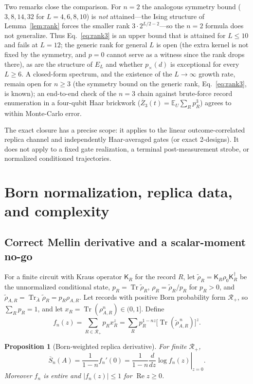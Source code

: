 \documentclass[aps,prx,reprint,superscriptaddress,nobibnotes,longbibliography]{revtex4-2}
\newtheorem{proposition}{Proposition}
\theoremstyle{remark}
\newcommand{\Tr}{\operatorname{Tr}}
\newcommand{\E}{\mathbb E}
\begin{document}
Two remarks close the comparison.  For $n=2$ the analogous symmetry bound ($3,8,14,32$ for $L=4,6,8,10$) is \emph{not} attained---the Ising structure of Lemma~\ref{lem:rank} forces the smaller rank $3\cdot2^{L/2-2}$---so the $n=2$ formula does not generalize.  Thus Eq.~\eqref{eq:rank3} is an upper bound that is attained for $L\le10$ and fails at $L=12$; the generic rank for general $L$ is open (the extra kernel is not fixed by the symmetry, and $p=0$ cannot serve as a witness since the rank drops there), as are the structure of $E_L$ and whether $p_\times(d)$ is exceptional for every $L\ge6$.  A closed-form spectrum, and the existence of the $L\to\infty$ growth rate, remain open for $n\ge3$ (the symmetry bound on the generic rank, Eq.~\eqref{eq:rank3}, is known); an end-to-end check of the $n=3$ chain against brute-force record enumeration in a four-qubit Haar brickwork ($\overline Z_3(t)=\E_U\sum_Rp_R^3$) agrees to within Monte-Carlo error.

The exact closure has a precise scope: it applies to the linear outcome-correlated replica channel and independently Haar-averaged gates (or exact 2-designs).  It does not apply to a fixed gate realization, a terminal post-measurement strobe, or normalized conditioned trajectories.

\section{Born normalization, replica data, and complexity}

\subsection{Correct Mellin derivative and a scalar-moment no-go}

For a finite circuit with Kraus operator $\mathsf K_R$ for the record $R$, let $\tilde\rho_R=\mathsf K_R\rho_0\mathsf K_R^\dagger$ be the unnormalized conditional state, $p_R=\Tr\tilde\rho_R$, $\rho_R=\tilde\rho_R/p_R$ for $p_R>0$, and $\tilde\rho_{A,R}=\Tr_{\bar A}\tilde\rho_R=p_R\rho_{A,R}$.  Let records with positive Born probability form $\mathcal R_+$, so $\sum_Rp_R=1$, and let
$x_R=\Tr(\rho_{A,R}^n)\in(0,1]$.  Define
\begin{equation}
 f_n(z)=\sum_{R\in\mathcal R_+}p_Rx_R^z
 =\sum_Rp_R^{1-nz}\bigl[\Tr(\tilde\rho_{A,R}^{\,n})\bigr]^z.
 \label{eq:Mellin}
\end{equation}

\begin{proposition}[Born-weighted replica derivative]
\label{prop:replica-derivative}
For finite $\mathcal R_+$,
\begin{equation}
 \overline S_n(A)=\frac1{1-n}f_n'(0)
 =\frac1{1-n}\left.\frac{d}{dz}\log f_n(z)\right|_{z=0}.
 \label{eq:replicaderiv}
\end{equation}
Moreover $f_n$ is entire and $|f_n(z)|\le1$ for $\operatorname{Re}z\ge0$.
\end{proposition}
\end{document}
